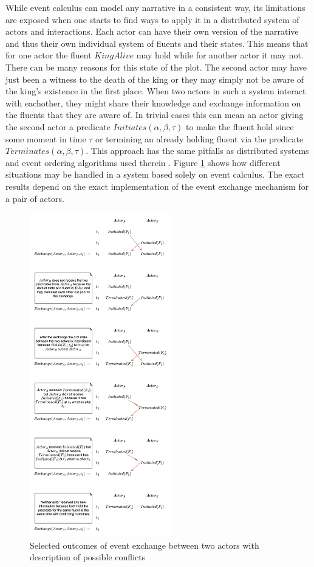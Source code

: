 While event calculus can model any narrative in a consistent way, its limitations are exposed when one starts to find ways to apply it in a distributed system of actors and interactions.
Each actor can have their own version of the narrative and thus their own individual system of fluents and their states.
This means that for one actor the fluent $KingAlive$ may hold while for another actor it may not.
There can be many reasons for this state of the plot.
The second actor may have just been a witness to the death of the king or they may simply not be aware of the king's existence in the first place.
When two actors in such a system interact with eachother, they might share their knowledge and exchange information on the fluents that they are aware of.
In trivial cases this can mean an actor giving the second actor a predicate $Initiates \left( \alpha, \beta, \tau \right)$ to make the fluent hold since some moment in time $\tau$ or termining an already holding fluent via the predicate $Terminates \left( \alpha, \beta, \tau \right)$.
This approach has the same pitfalls as distributed systems and event ordering algorithms used therein \cite{lamport2019time}.
Figure \ref{fig:temporal_conflicts_in_event_exchange} shows how different situations may be handled in a system based solely on event calculus.
The exact results depend on the exact implementation of the event exchange mechanism for a pair of actors.

\begin{figure}
    \centering
    \includegraphics[width=0.55\textwidth]{images/temporal_conflicts_in_event_exchange.drawio.png}
    \caption{Selected outcomes of event exchange between two actors with description of possible conflicts}
    \label{fig:temporal_conflicts_in_event_exchange}
\end{figure}


